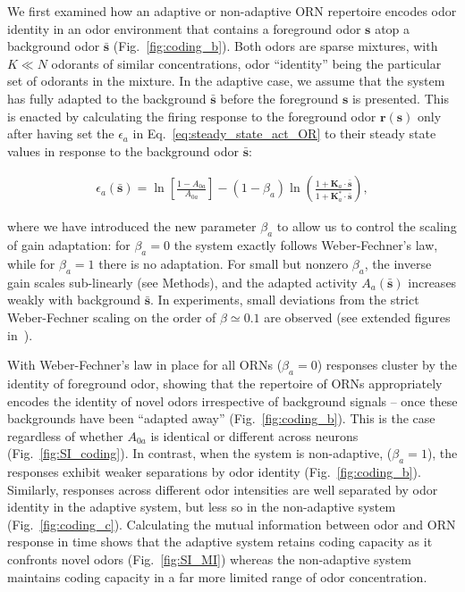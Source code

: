 \documentclass[10pt,prl,aps,showpacs,twocolumn,unsortedaddress,showkeys,linenumbers]{revtex4-1}
\begin{document}
We first examined how an adaptive or non-adaptive ORN repertoire encodes odor identity in an odor environment that contains a foreground odor $\mathbf{s}$ atop a background odor $\bar{\mathbf{s}}$ (Fig.~\ref{fig:coding_b}). Both odors are sparse mixtures, with $K \ll N$ odorants of similar concentrations, odor ``identity'' being the particular set of odorants in the mixture. In the adaptive case, we assume that the system has fully adapted to the background $\bar{\mathbf{s}}$ before the foreground $\mathbf{s}$ is presented. This is enacted by calculating the firing response to the foreground odor $\mathbf{r}(\mathbf{s})$ only after having set the $\epsilon_a$ in Eq.~\ref{eq:steady_state_act_OR} to their steady state values in response to the background odor $\bar{\mathbf{s}}$: 
{\color {blue} 
\begin{align}
    \epsilon_{a}(\bar{\mathbf s}) = \ln\left[\frac{1-A_{0a}}{A_{0a}}\right] - \left(1-\beta_a\right)\ln\left(\frac{1 + \mathbf{K}_a\cdot\bar{\mathbf{s}}}{1 + \mathbf{K}^*_a\cdot\bar{\mathbf{s}}}\right),
    \label{eq:beta}
\end{align}

where we have introduced the new parameter $\beta_a$ to allow us to control the scaling of gain adaptation: for $\beta_a=0$ the system exactly follows Weber-Fechner's law, while for $\beta_a=1$ there is no adaptation. For small but nonzero $\beta_a$, the inverse gain scales sub-linearly (see Methods), and the adapted activity $A_a(\bar{\mathbf s})$ increases weakly with background $\bar{\mathbf s}$. In experiments, small deviations from the strict Weber-Fechner scaling on the order of $\beta\simeq 0.1$ are observed (see extended figures in~\cite{srinivas_elife}).
}


With Weber-Fechner's law in place for all ORNs ($\beta_a=0$) responses cluster by the identity of foreground odor, showing that the repertoire of ORNs appropriately encodes the identity of novel odors irrespective of background signals -- once these backgrounds have been ``adapted away'' (Fig.~\ref{fig:coding_b}). 
{\color {blue} 
This is the case regardless of whether $A_{0a}$ is identical or different across neurons (Fig.~\ref{fig:SI_coding}). 
}
In contrast, when the system is non-adaptive, ($\beta_a=1$), the responses exhibit weaker separations by odor identity (Fig.~\ref{fig:coding_b}). Similarly, responses across different odor intensities are well separated by odor identity in the adaptive system, but less so in the non-adaptive system (Fig.~\ref{fig:coding_c}). Calculating the mutual information between odor and ORN response in time shows that the adaptive system retains coding capacity as it confronts novel odors (Fig.~\ref{fig:SI_MI}) whereas the non-adaptive system maintains coding capacity in a far more limited range of odor concentration.
\end{document}
